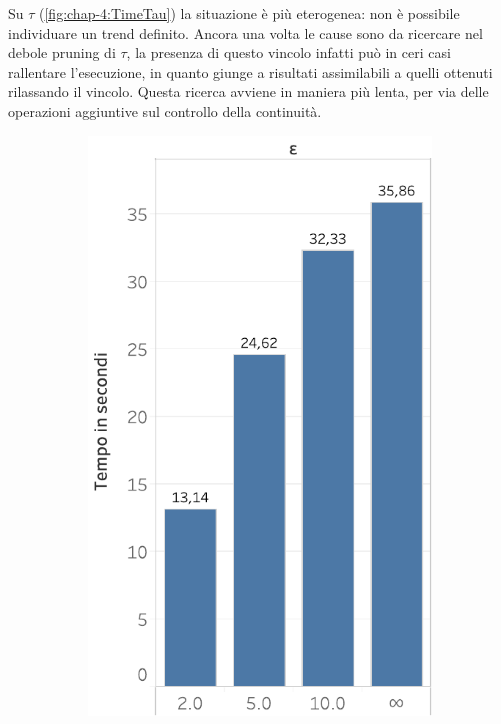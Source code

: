 Su \(\tau\) (\cref{fig:chap-4:TimeTau}) la situazione è più eterogenea: non è possibile individuare un trend definito.
Ancora una volta le cause sono da ricercare nel debole pruning di \(\tau\), la presenza di questo vincolo infatti può in ceri casi rallentare l'esecuzione, in quanto giunge a risultati assimilabili a quelli ottenuti rilassando il vincolo.
Questa ricerca avviene in maniera più lenta, per via delle operazioni aggiuntive sul controllo della continuità.

\begin{figure}
  \centering
   \begin{subfigure}{.5\textwidth}
  \centering
    \includegraphics[scale=0.5]{res/fig/sec-4/performance/TimeEpsilon.pdf}

\end{subfigure}
\end{figure}
